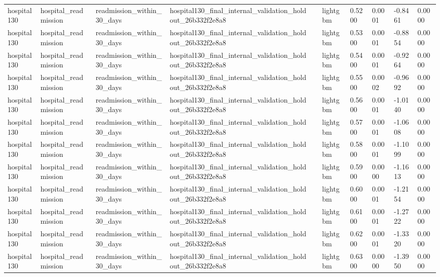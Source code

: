\begin{tabular}{llllllllll}
hospital130 & hospital\_readmission & readmission\_within\_30\_days & hospital130\_final\_internal\_validation\_holdout\_26b332f2e8a8 &  & lightgbm & 0.5200 & 0.0001 & -0.8461 & 0.0000 \\
hospital130 & hospital\_readmission & readmission\_within\_30\_days & hospital130\_final\_internal\_validation\_holdout\_26b332f2e8a8 &  & lightgbm & 0.5300 & 0.0001 & -0.8854 & 0.0000 \\
hospital130 & hospital\_readmission & readmission\_within\_30\_days & hospital130\_final\_internal\_validation\_holdout\_26b332f2e8a8 &  & lightgbm & 0.5400 & 0.0001 & -0.9264 & 0.0000 \\
hospital130 & hospital\_readmission & readmission\_within\_30\_days & hospital130\_final\_internal\_validation\_holdout\_26b332f2e8a8 &  & lightgbm & 0.5500 & 0.0002 & -0.9692 & 0.0000 \\
hospital130 & hospital\_readmission & readmission\_within\_30\_days & hospital130\_final\_internal\_validation\_holdout\_26b332f2e8a8 &  & lightgbm & 0.5600 & 0.0001 & -1.0140 & 0.0000 \\
hospital130 & hospital\_readmission & readmission\_within\_30\_days & hospital130\_final\_internal\_validation\_holdout\_26b332f2e8a8 &  & lightgbm & 0.5700 & 0.0001 & -1.0608 & 0.0000 \\
hospital130 & hospital\_readmission & readmission\_within\_30\_days & hospital130\_final\_internal\_validation\_holdout\_26b332f2e8a8 &  & lightgbm & 0.5800 & 0.0001 & -1.1099 & 0.0000 \\
hospital130 & hospital\_readmission & readmission\_within\_30\_days & hospital130\_final\_internal\_validation\_holdout\_26b332f2e8a8 &  & lightgbm & 0.5900 & 0.0000 & -1.1613 & 0.0000 \\
hospital130 & hospital\_readmission & readmission\_within\_30\_days & hospital130\_final\_internal\_validation\_holdout\_26b332f2e8a8 &  & lightgbm & 0.6000 & 0.0001 & -1.2154 & 0.0000 \\
hospital130 & hospital\_readmission & readmission\_within\_30\_days & hospital130\_final\_internal\_validation\_holdout\_26b332f2e8a8 &  & lightgbm & 0.6100 & 0.0001 & -1.2722 & 0.0000 \\
hospital130 & hospital\_readmission & readmission\_within\_30\_days & hospital130\_final\_internal\_validation\_holdout\_26b332f2e8a8 &  & lightgbm & 0.6200 & 0.0001 & -1.3320 & 0.0000 \\
hospital130 & hospital\_readmission & readmission\_within\_30\_days & hospital130\_final\_internal\_validation\_holdout\_26b332f2e8a8 &  & lightgbm & 0.6300 & 0.0000 & -1.3950 & 0.0000 \\

\end{tabular}
